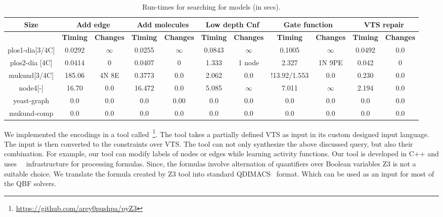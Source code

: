 
\begin{table}[t]
  \centering
  \begin{tabular}[t]{|c|c|c|c|c|c|c|c|c|c|c}\hline
    {\multirow{2}{*} \textbf{Size}}  & \multicolumn{2}{c|}{\textbf{Add edge}} & \multicolumn{2}{c|}{\textbf{Add molecules}} & \multicolumn{2}{c|}{\textbf{Low depth Cnf}}  &  \multicolumn{2}{c|}{\textbf{Gate function}} &  \multicolumn{2}{c|}{\textbf{VTS repair}} \\\hline
   
   \cline{2-9}
    {} & {\textbf{Timing}} & {\textbf{Changes}} & {\textbf{Timing}} & {\textbf{Changes}} & {\textbf{Timing}} & {\textbf{Changes}} & {\textbf{Timing}} & {\textbf{Changes}} & {\textbf{Timing}} & {\textbf{Changes}} \\\hline
    
    plos1-dia[3/4C] & 0.0292 & $\infty$ & 0.0255 & $\infty$ & 0.0843 & $\infty$ & 0.1005 & $\infty$ & 0.0492 & 0.0\\\hline
    plos2-dia [4C] & 0.0414 & 0 & 0.0407 & 0 & 1.333 & 1 node & 2.327 & 1N 9PE & 0.042 & 0 \\\hline
    mukund[3/4C] & 185.06 & 4N 8E & 0.3773 & 0.0 & 2.062 & 0.0 & !13.92/1.553 & 0.0 & 0.230 & 0.0 \\\hline
    node4[-] & 16.70 & 0.0 & 16.472 & 0.0 &  5.085 & $\infty$ & 7.011 & $\infty$ & 2.194 & 0.0\\\hline
    yeast-graph & 0.0 & 0.0 & 0.0 & 0.00 & 0.0 & 0.0 & 0.0  & 0.0 & 0.0 & 0.0 \\\hline
    mukund-comp & 0.0 & 0.0 & 0.0 & 0.0 & 0.0 & 0.0 & 0.0 & 0.0 & 0.0 & 0.0\\\hline
  \end{tabular}
  \caption{Run-times for searching for models (in secs).}
  \label{tab:qf-grabh}
\end{table}


We implemented the encodings in a tool called~\ourtool\footnote{{\url{https://github.com/arey0pushpa/pyZ3}}}.
%
The tool takes a partially defined VTS as input in its custom designed
input language. The input is then converted to the constraints over VTS. 
%
The tool can not only synthesize the above discussed query, but also their
combination.
%
For example, our tool can modify labels of nodes or edges while
learning activity functions.
%
Our tool is developed in C++ and uses~\zthree~\cite{z3} infrastructure for
processing formulas. 
%
Since, the formulas involve alternation of quantifiers over Boolean variables Z3 is not a suitable choice. We translate the formula created by Z3 tool into standard QDIMACS~\cite{qdimacs} format. Which can be used as an input for most of the QBF solvers. 

